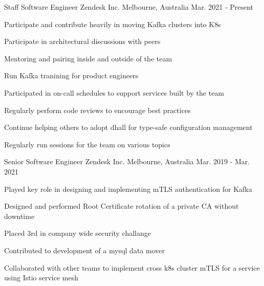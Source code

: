 

\begin{cventries}

  \cventry
    {Staff Software Engineer} %
    {Zendesk Inc.} %
    {Melbourne, Australia} %
    {Mar. 2021 - Present} %
    {
      \begin{cvitems} %
        \item {Participate and contribute heavily in moving Kafka clusters into K8s}
        \item {Participate in architectural discussions with peers}
        \item {Mentoring and pairing inside and outside of the team}
        \item {Run Kafka tranining for product engineers}
        \item {Participated in on-call schedules to support services built by the team}
        \item {Regularly perform code reviews to encourage best practices}
        \item {Continue helping others to adopt dhall for type-safe configuration management}
        \item {Regularly run sessions for the team on various topics}
      \end{cvitems}
    }

  \cventry
    {Senior Software Engineer} %
    {Zendesk Inc.} %
    {Melbourne, Australia} %
    {Mar. 2019 - Mar. 2021} %
    {
      \begin{cvitems} %
        \item {Played key role in designing and implementing mTLS authentication for Kafka}
        \item {Designed and performed Root Certificate rotation of a private CA without downtime}
        \item {Placed 3rd in company wide security challange}
        \item {Contributed to development of a mysql data mover}
        \item {Collaborated with other teams to implement cross k8s cluster mTLS for a service using Istio service mesh}
      \end{cvitems}
    }


\end{cventries}
